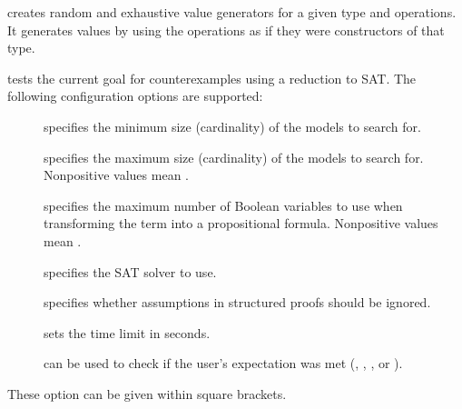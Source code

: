 \begin{isabellebody}
\begin{isamarkuptext}
\begin{description}
  \item \hyperlink{command.HOL.quickcheck-generator}{\mbox{}} creates random and
  exhaustive value generators for a given type and operations.  It
  generates values by using the operations as if they were
  constructors of that type.

  \item \hyperlink{command.HOL.refute}{\mbox{}} tests the current goal for
  counterexamples using a reduction to SAT. The following
  configuration options are supported:

    \begin{description}

    \item[] specifies the minimum size (cardinality) of
    the models to search for.

    \item[] specifies the maximum size (cardinality) of
    the models to search for. Nonpositive values mean .

    \item[] specifies the maximum number of Boolean
    variables to use when transforming the term into a propositional
    formula.  Nonpositive values mean .

    \item[] specifies the SAT solver to use.

    \item[] specifies whether assumptions in
    structured proofs should be ignored.

    \item[] sets the time limit in seconds.

    \item[] can be used to check if the user's
    expectation was met (, , , or ).

    \end{description}

  These option can be given within square brackets.


\end{description}
\end{isamarkuptext}
\end{isabellebody}
